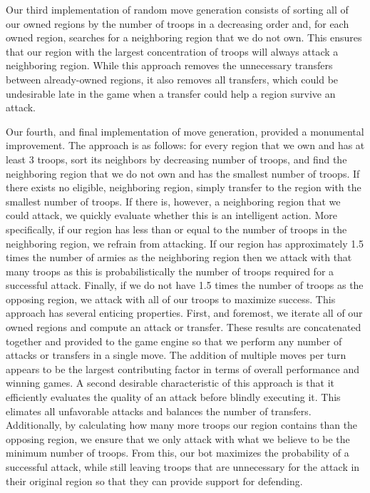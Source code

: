\documentclass[a4paper,11pt]{article}
\begin{document}
Our third implementation of random move generation consists of sorting all of our owned regions
by the number of troops in a decreasing order and, for each owned region, searches for a neighboring
region that we do not own. This ensures that our region with the largest concentration of troops will
always attack a neighboring region. While this approach removes the unnecessary transfers between 
already-owned regions, it also removes all transfers, which could be undesirable late in the game
when a transfer could help a region survive an attack. 

Our fourth, and final implementation of move generation, provided a monumental improvement.  The 
approach is as follows: for every region that we own and has at least 3 troops, sort its neighbors 
by decreasing number of troops, and find the neighboring region that we do not own and has the smallest
 number of troops. If there exists no eligible, neighboring region, simply transfer to the region with 
the smallest number of troops.  If there is, however, a neighboring region that we could attack, we 
quickly evaluate whether this is  an intelligent action.  More specifically, if our region has less 
than or equal to the number of troops in the neighboring region, we refrain from attacking.  If our 
region has approximately 1.5 times the number of armies as the neighboring region then we attack with 
that many troops as this is probabilistically the number of troops required for a successful attack. 
Finally, if we do not have 1.5 times the number of troops as the opposing region, we attack with all 
of our troops to maximize success. This approach has several enticing properties.  First, and 
foremost, we iterate all of our owned regions and compute an attack or transfer.  These results are 
concatenated together and provided to the game engine so that we perform any number of attacks or 
transfers in a single move.  The addition of multiple moves per turn appears to be the largest 
contributing factor in terms of overall performance and winning games. A second desirable 
characteristic of this approach is that it efficiently evaluates the quality of an attack before blindly
executing it.  This elimates all unfavorable attacks and balances the number of transfers. 
Additionally, by calculating how many more troops our region contains than the opposing region, we 
ensure that we only attack with what we believe to be the minimum number of troops.  From this, our bot
maximizes the probability of a successful attack, while still leaving troops that are unnecessary for
the attack in their original region so that they can provide support for defending.
\end{document}
